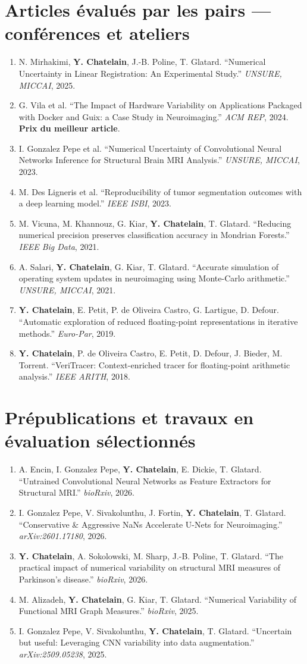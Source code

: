 \documentclass[10pt,letterpaper]{article}
\newcommand{\pub}[1]{\item #1}
\newcommand{\me}{\textbf{Y. Chatelain}}
\begin{document}
\section{Articles évalués par les pairs --- conférences et ateliers}
\begin{enumerate}[leftmargin=1.5em,label={\color{navy}\arabic*.},itemsep=2pt,topsep=1pt]
  \pub{N. Mirhakimi, \me, J.-B. Poline, T. Glatard. ``Numerical Uncertainty in Linear Registration: An Experimental Study.'' \textit{UNSURE, MICCAI}, 2025.}
  \pub{G. Vila et al. ``The Impact of Hardware Variability on Applications Packaged with Docker and Guix: a Case Study in Neuroimaging.'' \textit{ACM REP}, 2024. \textbf{Prix du meilleur article}.}
  \pub{I. Gonzalez Pepe et al. ``Numerical Uncertainty of Convolutional Neural Networks Inference for Structural Brain MRI Analysis.'' \textit{UNSURE, MICCAI}, 2023.}
  \pub{M. Des Ligneris et al. ``Reproducibility of tumor segmentation outcomes with a deep learning model.'' \textit{IEEE ISBI}, 2023.}
  \pub{M. Vicuna, M. Khannouz, G. Kiar, \me, T. Glatard. ``Reducing numerical precision preserves classification accuracy in Mondrian Forests.'' \textit{IEEE Big Data}, 2021.}
  \pub{A. Salari, \me, G. Kiar, T. Glatard. ``Accurate simulation of operating system updates in neuroimaging using Monte-Carlo arithmetic.'' \textit{UNSURE, MICCAI}, 2021.}
  \pub{\me, E. Petit, P. de Oliveira Castro, G. Lartigue, D. Defour. ``Automatic exploration of reduced floating-point representations in iterative methods.'' \textit{Euro-Par}, 2019.}
  \pub{\me, P. de Oliveira Castro, E. Petit, D. Defour, J. Bieder, M. Torrent. ``VeriTracer: Context-enriched tracer for floating-point arithmetic analysis.'' \textit{IEEE ARITH}, 2018.}
\end{enumerate}

\section{Prépublications et travaux en évaluation sélectionnés}
\begin{enumerate}[leftmargin=1.5em,label={\color{navy}\arabic*.},itemsep=2pt,topsep=1pt]
  \pub{A. Encin, I. Gonzalez Pepe, \me, E. Dickie, T. Glatard. ``Untrained Convolutional Neural Networks as Feature Extractors for Structural MRI.'' \textit{bioRxiv}, 2026.}
  \pub{I. Gonzalez Pepe, V. Sivakolunthu, J. Fortin, \me, T. Glatard. ``Conservative \& Aggressive NaNs Accelerate U-Nets for Neuroimaging.'' \textit{arXiv:2601.17180}, 2026.}
  \pub{\me, A. Sokolowski, M. Sharp, J.-B. Poline, T. Glatard. ``The practical impact of numerical variability on structural MRI measures of Parkinson's disease.'' \textit{bioRxiv}, 2026.}
  \pub{M. Alizadeh, \me, G. Kiar, T. Glatard. ``Numerical Variability of Functional MRI Graph Measures.'' \textit{bioRxiv}, 2025.}
  \pub{I. Gonzalez Pepe, V. Sivakolunthu, \me, T. Glatard. ``Uncertain but useful: Leveraging CNN variability into data augmentation.'' \textit{arXiv:2509.05238}, 2025.}
\end{enumerate}
\end{document}
